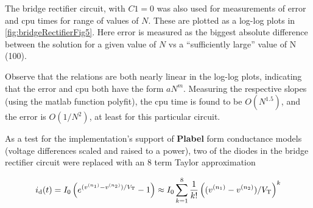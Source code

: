 
The bridge rectifier circuit, with \( C1 = 0 \) was also used for
measurements of error and cpu times for range of values of \( N \).
These are plotted as a log-log plots in
\cref{fig:bridgeRectifierFig5}.
Here error is measured as the biggest absolute difference between the solution for a given value of \( N \) vs
a ``sufficiently large'' value of N (100).


Observe that the relations are both nearly linear in the log-log plots, indicating that the error and cpu both have the form \( a N^m \).
Measuring the respective slopes (using the matlab function polyfit), the cpu time is found to be \( O(N^{1.5}) \), and the error is \( O(1/N^2) \), at least for this particular circuit.



As a test for the implementation's support of \textbf{Plabel} form conductance models (voltage differences scaled and raised to a power),
two of the diodes in the bridge rectifier circuit were replaced with an 8 term Taylor approximation

\begin{dmath}\label{eqn:ece1254projectReport:1480}
i_{\textrm{d}}(t) = I_0 \lr{ e^{(v^{(n_1)} - v^{(n_2)})/V_{\textrm{T}}} - 1}
\approx
I_0 \sum_{k=1}^8
\inv{k!} \lr{(v^{(n_1)} - v^{(n_2)})/V_{\textrm{T}}}^k
\end{dmath}

